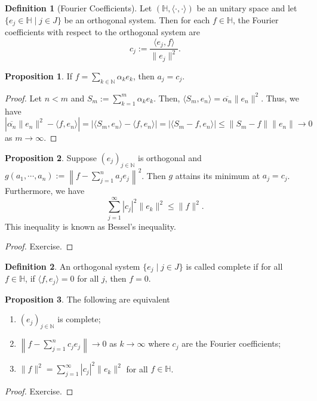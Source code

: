 \documentclass[]{article}
\theoremstyle{definition}
\theoremstyle{definition}
\newtheorem{definition}{Definition}[section]
\newtheorem{proposition}{Proposition}[section]
\begin{document}
\begin{definition}[Fourier Coefficients]
  Let \((\mathbb{H}, \langle \cdot, \cdot \rangle)\) be an unitary space 
  and let \(\{e_j \in \mathbb{H} \mid j \in J\}\) be an orthogonal system. 
  Then for each \(f \in \mathbb{H}\), the Fourier coefficients with respect to 
  the orthogonal system are 
  \[c_j := \frac{\langle e_j, f \rangle}{\|e_j\|^2}.\]
\end{definition} 

\begin{proposition}
  If \(f = \sum_{k \in \mathbb{N}} \alpha_k e_k\), then \(a_j = c_j\).
\end{proposition}
\begin{proof}
  Let \(n < m\) and \(S_m := \sum_{k = 1}^m \alpha_k e_k\). Then, 
  \(\langle S_m, e_n\rangle = \overline{\alpha_n} \|e_n\|^2\). Thus, we have 
  \[|\overline{\alpha_n} \|e_n\|^2 - \langle f, e_n\rangle| = 
    |\langle S_m, e_n\rangle - \langle f, e_n\rangle | = 
    |\langle S_m - f, e_n \rangle|\le\|S_m - f\| \|e_n\| \to 0\]
  as \(m \to \infty\). 
\end{proof}

\begin{proposition}
  Suppose \((e_j)_{j \in \mathbb{N}}\) is orthogonal and 
  \(g(a_1, \cdots, a_n) := \left\| f - \sum_{j = 1}^n a_je_j\right\|^2\). 
  Then \(g\) attains its minimum at \(a_j = c_j\). Furthermore, 
  we have 
  \[\sum_{j = 1}^\infty |c_j|^2\|e_k\|^2 \le \|f\|^2.\]
  This inequality is known as Bessel's inequality.
\end{proposition}
\begin{proof}
  Exercise.
\end{proof}

\begin{definition}
  An orthogonal system \(\{e_j \mid j \in J\}\) is called complete if 
  for all \(f \in \mathbb{H}\), if \(\langle f, e_j \rangle = 0\) for all 
  \(j\), then \(f = 0\).
\end{definition}

\begin{proposition}
  The following are equivalent
  \begin{enumerate}
    \item \((e_j)_{j \in \mathbb{N}}\) is complete;
    \item \(\left\|f - \sum_{j = 1}^n c_je_j\right\| \to 0\) as \(k \to \infty\) where 
      \(c_j\) are the Fourier coefficients;
    \item \(\|f\|^2 = \sum_{j = 1}^\infty |c_j|^2\|e_k\|^2\) for all 
      \(f \in \mathbb{H}\).
  \end{enumerate}
\end{proposition}
\begin{proof}
  Exercise.
\end{proof}
\end{document}
